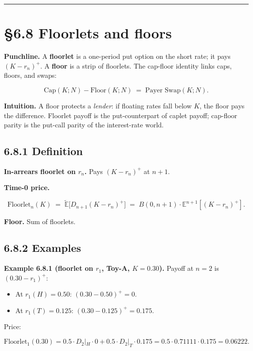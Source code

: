 \documentclass[
  10pt,
  twoside]{book}
\providecommand{\tightlist}{%
  \setlength{\itemsep}{0pt}\setlength{\parskip}{0pt}}
\begin{document}
\begin{center}\rule{0.5\linewidth}{0.5pt}\end{center}

\section{§6.8 Floorlets and floors}\label{floorlets-and-floors}

\textbf{Punchline.} A \textbf{floorlet} is a one-period put option on
the short rate; it pays \((K - r_n)^+\). A \textbf{floor} is a strip of
floorlets. The cap-floor identity links caps, floors, and swaps:

\[\text{Cap}(K; N) - \text{Floor}(K; N) \;=\; \text{Payer Swap}(K; N).\]

\textbf{Intuition.} A floor protects a \emph{lender}: if floating rates
fall below \(K\), the floor pays the difference. Floorlet payoff is the
put-counterpart of caplet payoff; cap-floor parity is the put-call
parity of the interest-rate world.

\subsection{6.8.1 Definition}\label{definition}

\textbf{In-arrears floorlet on \(r_n\).} Pays \((K - r_n)^+\) at
\(n+1\).

\textbf{Time-0 price.}

\[\text{Floorlet}_n(K) \;=\; \tilde{\mathbb E}\bigl[D_{n+1}(K - r_n)^+\bigr] \;=\; B(0, n+1) \cdot \mathbb E^{n+1}[(K - r_n)^+].\]

\textbf{Floor.} Sum of floorlets.

\subsection{6.8.2 Examples}\label{examples-32}

\textbf{Example 6.8.1 (floorlet on \(r_1\), Toy-A, \(K = 0.30\)).}
Payoff at \(n = 2\) is \((0.30 - r_1)^+\):

\begin{itemize}
\tightlist
\item
  At \(r_1(H) = 0.50\): \((0.30 - 0.50)^+ = 0\).
\item
  At \(r_1(T) = 0.125\): \((0.30 - 0.125)^+ = 0.175\).
\end{itemize}

Price:

\[\text{Floorlet}_1(0.30) = 0.5 \cdot D_2|_H \cdot 0 + 0.5 \cdot D_2|_T \cdot 0.175 = 0.5 \cdot 0.71111 \cdot 0.175 = 0.06222.\]
\end{document}
